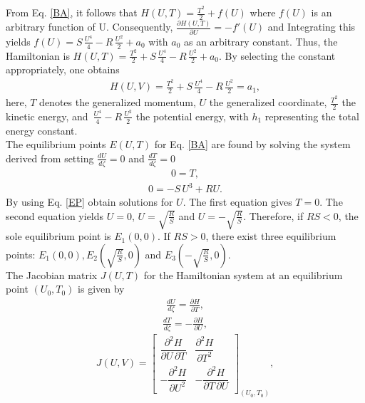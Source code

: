 \documentclass{article}
\numberwithin{equation}{section}
\begin{document}
From Eq. \ref{BA}, it follows that $H(U, T)=\frac{T^2}{2}+f(U)$ where $f(U)$ is an arbitrary function of U. Consequently, $\frac{\partial H(U,T)}{\partial U} =-f'(U)$ and Integrating this yields $f(U)=S\,\frac{U^4}{4}-R\,\frac{U^2}{2}+a_{0}$ with $a_{0}$ as an arbitrary constant. Thus, the Hamiltonian is $H(U, T) = \frac{T^2}{2}+S\,\frac{U^4}{4}-R\,\frac{U^2}{2}+a_{0}$. By selecting the constant appropriately, one obtains\\
\begin{eqnarray}
H(U, V) = \frac{T^2}{2}+S\,\frac{U^4}{4}-R\,\frac{U^2}{2}=a_{1},
\end{eqnarray}
here, $T$ denotes the generalized momentum, $U$ the generalized coordinate, $\frac{T^2}{2}$ the kinetic energy, and $\,\frac{U^4}{4}-R\,\frac{U^2}{2}$ the potential energy, with $h_{1}$ representing the total energy constant.\\
The equilibrium points $E(U, T)$ for Eq. \ref{BA} are found by solving the system derived from setting $\frac{d U}{d \zeta}= 0$ and $\frac{d T}{d \zeta} = 0$
\begin{eqnarray}\label{EP}
0 = T,\nonumber
\end{eqnarray}
\begin{eqnarray}
0 = -S \,U^{3}+R U.
\end{eqnarray}
By using Eq. \ref{EP} obtain solutions for $U$. The first equation gives $T = 0$. The second equation yields $U=0$, $U=\sqrt{\frac{R}{S}}$ and $U=-\sqrt{\frac{R}{S}}$. Therefore, if $RS < 0$, the sole equilibrium point is $E_{1}(0, 0)$. If $RS > 0$, there exist three equilibrium points: $E_{1}(0, 0), E_{2}(\sqrt{\frac{R}{S}},0)$ and $E_{3}(-\sqrt{\frac{R}{S}}, 0)$.\\
The Jacobian matrix $J(U, T)$ for the Hamiltonian system at an equilibrium point $(U_{0},T_{0})$ is given by
\begin{eqnarray}
\frac{d U}{d \zeta} = \frac{\partial H}{\partial T},
\end{eqnarray}
\begin{eqnarray}
\frac{d T}{d \zeta} = -\frac{\partial H}{\partial U},
\end{eqnarray}
\begin{equation}
J(U, V) =
\begin{bmatrix}
\dfrac{\partial^2 H}{\partial U \, \partial T} & \dfrac{\partial^2 H}{\partial T^2} \\[8pt]
-\dfrac{\partial^2 H}{\partial U^2} & -\dfrac{\partial^2 H}{\partial T \, \partial U}
\end{bmatrix}_{(U_0, T_0)},
\end{equation}
\end{document}
